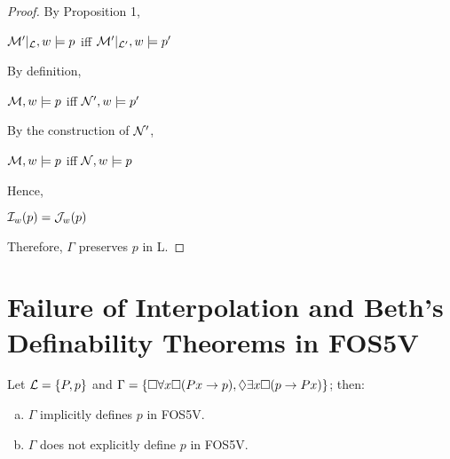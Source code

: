 \begin{proof}
\qquad By Proposition 1,
 
\begin{center}
$\mathcal{M}^{\prime}|_{\mathcal{L}},w \models p$ iff $\mathcal{M}^{\prime}|_{\mathcal{L}^{\prime}},w \models p^{\prime}$ 
\end{center}


\qquad By definition,

\begin{center}
$\mathcal{M},w \models p$ iff $\mathcal{N}^{\prime},w \models p^{\prime}$ 
\end{center}


\qquad By the construction of $\mathcal{N}^{\prime}$,

\begin{center}
$\mathcal{M},w \models p$ iff $\mathcal{N},w \models p$ 
\end{center}

\qquad Hence, 

\begin{center}
$\mathcal{I}_{w}(p) = \mathcal{J}_{w}(p)$ 
\end{center}

Therefore, $\Gamma$ preserves $p$ in L.
\end{proof}

\section{Failure of Interpolation and Beth's Definability  Theorems in FOS5V}

\begin{pro}
Let $\mathcal{L} =\{P,p\}$ and $\Gamma =\{\Box \forall x \Box (Px \rightarrow p), \Diamond \exists x \Box (p \rightarrow Px)\}$; then:
\begin{enumerate}[(a)]
\item $\Gamma$ implicitly defines $p$ in FOS5V.
\item $\Gamma$ does not explicitly define $p$ in FOS5V.
\end{enumerate}
\end{pro}

